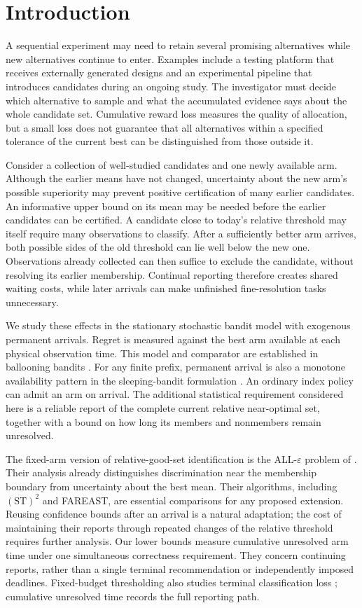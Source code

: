 \section{Introduction}
\label{sec:introduction}

A sequential experiment may need to retain several promising alternatives
while new alternatives continue to enter. Examples include a testing platform
that receives externally generated designs and an experimental pipeline that
introduces candidates during an ongoing study. The investigator must decide
which alternative to sample and what the accumulated evidence says about the
whole candidate set. Cumulative reward loss measures the quality of allocation,
but a small loss does not guarantee that all alternatives within a specified
tolerance of the current best can be distinguished from those outside it.

Consider a collection of well-studied candidates and one newly available arm.
Although the earlier means have not changed, uncertainty about the new arm's
possible superiority may prevent positive certification of many earlier
candidates. An informative upper bound on its mean may be needed before the
earlier candidates can be certified. A candidate close to today's relative
threshold may itself require many observations to classify. After a sufficiently
better arm arrives, both possible sides of
the old threshold can lie well below the new one. Observations already collected
can then suffice to exclude the candidate, without resolving its earlier
membership. Continual reporting therefore creates shared waiting costs, while
later arrivals can make unfinished fine-resolution tasks unnecessary.

We study these effects in the stationary stochastic bandit model with exogenous
permanent arrivals. Regret is measured against the best arm available at each
physical observation time. This model and comparator are established in
ballooning bandits \citep{ghalme2021}. For any finite prefix, permanent arrival
is also a monotone availability pattern in the sleeping-bandit formulation
\citep{kleinberg2010}. An ordinary index policy can admit an arm on arrival.
The additional statistical requirement considered here is a reliable report of
the complete current relative near-optimal set, together with a bound on how
long its members and nonmembers remain unresolved.

The fixed-arm version of relative-good-set identification is the
ALL-$\varepsilon$ problem of \citet{mason2020}. Their analysis already
distinguishes discrimination near the membership boundary from uncertainty
about the best mean. Their algorithms, including $(\mathrm{ST})^2$ and FAREAST,
are essential comparisons for any proposed extension. Reusing confidence bounds
after an arrival is a natural adaptation; the cost of maintaining their reports
through repeated changes of the relative threshold requires further analysis.
Our lower bounds measure cumulative unresolved arm time under one simultaneous
correctness requirement. They concern continuing reports, rather than a single
terminal recommendation or independently imposed deadlines.
Fixed-budget thresholding also studies terminal classification loss
\citep{cheshire2020}; cumulative unresolved time records the full reporting path.

